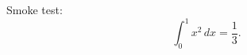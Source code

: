 \documentclass{article}
\begin{document}
Smoke test:
\[
  \int_0^1 x^2\,dx = \frac{1}{3}.
\]
\end{document}
